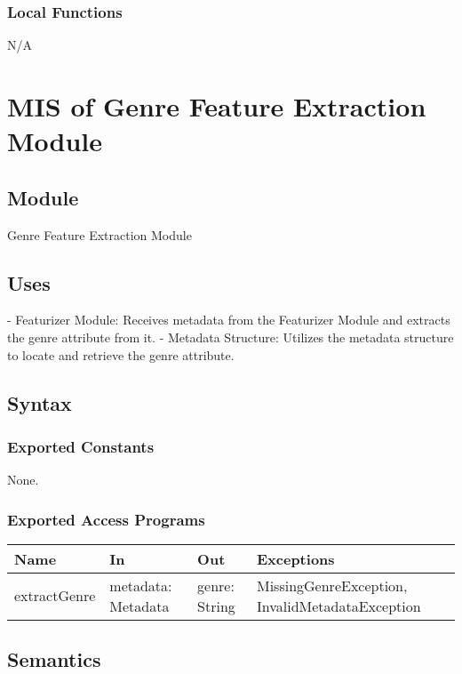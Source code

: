 \documentclass[12pt, titlepage]{article}
\begin{document}
\subsubsection{Local Functions}
N/A


\section{MIS of Genre Feature Extraction Module} \label{Module:GenreFeatureExtraction}

\subsection{Module}
Genre Feature Extraction Module

\subsection{Uses}
- Featurizer Module: Receives metadata from the Featurizer Module and extracts the genre attribute from it.
- Metadata Structure: Utilizes the metadata structure to locate and retrieve the genre attribute.

\subsection{Syntax}

\subsubsection{Exported Constants}
None.

\subsubsection{Exported Access Programs}

\begin{center}
\begin{tabular}{p{2cm} p{4cm} p{4cm} p{2cm}}
\hline
\textbf{Name} & \textbf{In} & \textbf{Out} & \textbf{Exceptions} \\
\hline
extractGenre & metadata: Metadata & genre: String & MissingGenreException, InvalidMetadataException \\
\hline
\end{tabular}
\end{center}

\subsection{Semantics}
\end{document}
